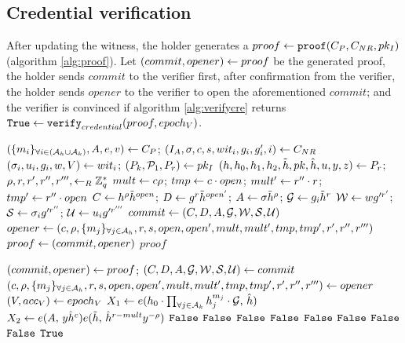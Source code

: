 \documentclass{article}
\begin{document}
\subsection{Credential verification}
After updating the witness, the holder generates a $proof\la \proofp $ (algorithm \ref{alg:proof}). Let $(commit, opener)\la proof$ be the generated proof, the holder sends $commit$ to the verifier first, after confirmation from the verifier, the holder sends $opener$ to the verifier to open the aforementioned $commit$; and the verifier is convinced if algorithm \ref{alg:verifycre} returns $\true \la \verifycon $.

\begin{algorithm}
\caption{$\proofp $}
\label{alg:proof}
\begin{algorithmic}
	\State $\cpp \la \cp$; $\cnrp \la \cnr$
	\State $\witip \la \witi $; $\pkip \la \pki $
	\State $\prp \la \pr $; $\rho , r, r', r'', r''', \lar \mbz{q}$
	\State $mult\la c\rho $; $tmp\la c \cdot open$; $mult'\la r''\cdot r$; $tmp'\la r'' \cdot open$
	\State $C\la h^{\rho }\td{h}^{open}$; $D\la g^{r}\td{h}^{open'}$; $A\la \sigma \td{h}^{\rho }$; $\mc{G}\la g_{i}\td{h}^{r}$
	\State $\mc{W}\la wg'^{r'}$; $\mc{S}\la \sigma _{i}g'^{r''}$; $\mc{U}\la u_{i}g'^{r'''}$
	\State $commit\la \commitp $ 
	\State $opener\la \openerp $
	\State $proof\la (commit, opener)$
	\State \Return $proof$
\end{algorithmic}
\end{algorithm}

\begin{algorithm}
\caption{$\verifycon $}
\label{alg:verifycre}
\begin{algorithmic}
	\State $(commit, opener) \la proof$; $\commitp \la commit$
	\State $\openerp \la opener $
	\State $\epp \la \epv $
	\State $X_{1}\la \pairing{h_{0}\cdot \prodi{j}{\ak}{h_{j}^{m_{j}}}\cdot \mc{G}}{\hat{h}}$
	\State $X_{2}\la \pairing{A}{y\hat{h}^{c}}\pairing{\td{h}}{\hat{h}^{r-mult}y^{-\rho }}$
		\State \Return $\false$
		\State \Return $\false$
		\State \Return $\false$
		\State \Return $\false$
		\State \Return $\false$
		\State \Return $\false$
		\State \Return $\false$
		\State \Return $\false$
	\Else
		\State \Return $\true$
	\EndIf
\end{algorithmic}
\end{algorithm}
\end{document}
